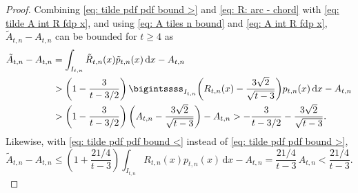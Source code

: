 \documentclass[12pt, a4paper]{article}
\newcommand{\diff}{\mathrm d}
\newcommand{\tiles}{t} %
\newcommand{\fdp}{p}
\newcommand{\intervx}{I}
\begin{document}
\begin{proof}
Combining \eqref{eq: tilde pdf pdf bound >} and \eqref{eq: R: arc - chord} with \eqref{eq: tilde A int R fdp x}, and using \eqref{eq: A tiles n bound} and \eqref{eq: A int R fdp x}, $\tilde A_{\tiles,n} - A_{\tiles,n}$ can be bounded for $\tiles \geq 4$ as
\begin{equation}
\label{eq: tilde A bound diff 1}
\begin{split}
\tilde A_{\tiles,n} - A_{\tiles,n} &= \int_{\intervx_{\tiles,n}} \tilde R_{\tiles,n}(x) \tilde \fdp_{\tiles,n}(x) \, \diff x - A_{\tiles,n} \\
&> \left( 1 - \frac 3 {\tiles-3/2} \right) \bigintssss_{\intervx_{\tiles,n}} \biggl( R_{\tiles,n}(x) - \frac{3\sqrt{2}} {\sqrt{\tiles-3}} \biggr) \fdp_{\tiles,n}(x) \, \diff x - A_{\tiles,n} \\
&> \left( 1 - \frac 3 {\tiles-3/2} \right) \biggl( A_{\tiles,n} - \frac{3\sqrt{2}}{\sqrt{\tiles-3}} \biggr) - A_{\tiles,n} > -\frac 3 {\tiles-3/2} - \frac{3\sqrt{2}}{\sqrt{\tiles-3}}.
\end{split}
\end{equation}
Likewise, with \eqref{eq: tilde pdf pdf bound <} instead of \eqref{eq: tilde pdf pdf bound >},
\begin{equation}
\label{eq: tilde A bound diff 2}
\tilde A_{\tiles,n} - A_{\tiles,n} \leq \left( 1 + \frac {21/4} {\tiles-3} \right) \int_{\intervx_{\tiles,n}} R_{\tiles,n}(x) \fdp_{\tiles,n}(x) \, \diff x - A_{\tiles,n} = \frac {21/4} {\tiles-3}\, A_{\tiles,n} < \frac {21/4} {\tiles-3}.
\end{equation}


\end{proof}
\end{document}
